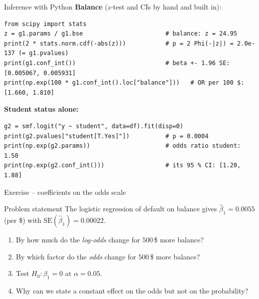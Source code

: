 \documentclass[aspectratio=169,11pt]{beamer}
\begin{document}
\begin{frame}[fragile]{Inference with Python}
  \textbf{Balance} ($z$-test and CIs by hand and built in):
\begin{lstlisting}
from scipy import stats
z = g1.params / g1.bse                       # balance: z = 24.95
print(2 * stats.norm.cdf(-abs(z)))           # p = 2 Phi(-|z|) = 2.0e-137 (= g1.pvalues)
print(g1.conf_int())                         # beta +- 1.96 SE: [0.005067, 0.005931]
print(np.exp(100 * g1.conf_int().loc["balance"]))   # OR per 100 $: [1.660, 1.810]
\end{lstlisting}
  \textbf{Student status alone:}
\begin{lstlisting}
g2 = smf.logit("y ~ student", data=df).fit(disp=0)
print(g2.pvalues["student[T.Yes]"])          # p = 0.0004
print(np.exp(g2.params))                     # odds ratio student: 1.50
print(np.exp(g2.conf_int()))                 # its 95 % CI: [1.20, 1.88]
\end{lstlisting}
\end{frame}

\begin{frame}{Exercise -- coefficients on the odds scale}
  \begin{block}{Problem statement}
    The logistic regression of default on balance gives
    $\hat\beta_1=0.0055$ (per \$) with $\mathrm{SE}(\hat\beta_1)=0.00022$.
    \begin{enumerate}
      \item By how much do the \emph{log-odds} change for $500$\,\$ more
            balance?
      \item By which factor do the \emph{odds} change for $500$\,\$ more
            balance?
      \item Test $H_0:\beta_1=0$ at $\alpha=0.05$.
      \item Why can we state a constant effect on the odds but not on the
            probability?
    \end{enumerate}
  \end{block}
\end{frame}
\end{document}
